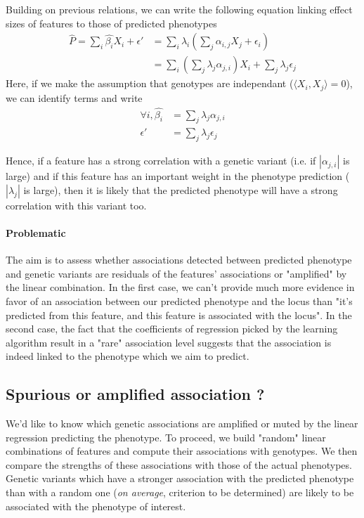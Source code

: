\documentclass{article}
\begin{document}
Building on previous relations, we can write the following equation linking effect sizes of features to those of predicted phenotypes
\begin{equation}
\begin{split}
\hat{P} = \sum_i {\hat{\beta_i}}X_i + \epsilon' &= \sum_i \lambda_i \left( \sum_j \alpha_{i,j}X_j + \epsilon_i \right) \\
&=\sum_i \left(\sum_j  \lambda_j \alpha_{j,i} \right) X_i + \sum_j \lambda_j \epsilon_j
\end{split}
\end{equation}
Here, if we make the assumption that genotypes are independant ($\langle X_i,X_j \rangle = 0$), we can identify terms and write
\begin{equation}
\begin{split}
\forall i,   \hat{\beta_i} &= \sum_j \lambda_j \alpha_{j,i} \\
\epsilon' &= \sum_j \lambda_j \epsilon_j
\end{split}
\end{equation}

Hence, if a feature has a strong correlation with a genetic variant (i.e. if $|\alpha_{j,i}|$ is large) and if this feature has an important weight in the phenotype prediction ($|\lambda_j|$ is large), then it is likely that the predicted phenotype will have a strong correlation with this variant too.

\paragraph{Problematic} The aim is to assess whether associations detected between predicted phenotype and genetic variants are residuals of the features' associations or "amplified" by the linear combination. In the first case, we can't provide much more evidence in favor of an association between our predicted phenotype and the locus than "it's predicted from this feature, and this feature is associated with the locus". In the second case, the fact that the coefficients of regression picked by the learning algorithm result in a "rare" association level suggests that the association is indeed linked to the phenotype which we aim to predict.

\subsection{Spurious or amplified association ?}

We'd like to know which genetic associations are amplified or muted by the linear regression predicting the phenotype. To proceed, we build "random" linear combinations of features and compute their associations with genotypes. We then compare the strengths of these associations with those of the actual phenotypes. Genetic variants which have a stronger association with the predicted phenotype than with a random one (\emph{on average}, criterion to be determined) are likely to be associated with the phenotype of interest.
\end{document}
